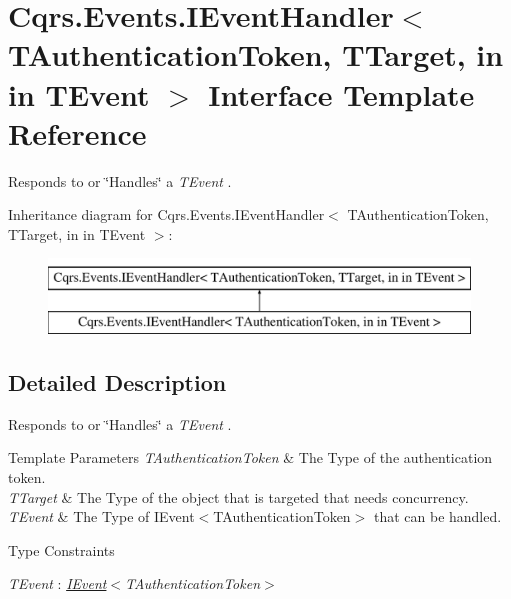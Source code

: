 \hypertarget{interfaceCqrs_1_1Events_1_1IEventHandler}{}\section{Cqrs.\+Events.\+I\+Event\+Handler$<$ T\+Authentication\+Token, T\+Target, in in T\+Event $>$ Interface Template Reference}
\label{interfaceCqrs_1_1Events_1_1IEventHandler}


Responds to or \char`\"{}\+Handles\char`\"{} a {\itshape T\+Event} .  


Inheritance diagram for Cqrs.\+Events.\+I\+Event\+Handler$<$ T\+Authentication\+Token, T\+Target, in in T\+Event $>$\+:\begin{figure}[H]
\begin{center}
\leavevmode
\includegraphics[height=2.000000cm]{interfaceCqrs_1_1Events_1_1IEventHandler}
\end{center}
\end{figure}


\subsection{Detailed Description}
Responds to or \char`\"{}\+Handles\char`\"{} a {\itshape T\+Event} . 


\begin{DoxyTemplParams}{Template Parameters}
{\em T\+Authentication\+Token} & The Type of the authentication token.\\
\hline
{\em T\+Target} & The Type of the object that is targeted that needs concurrency.\\
\hline
{\em T\+Event} & The Type of I\+Event$<$\+T\+Authentication\+Token$>$ that can be handled.\\
\hline
\end{DoxyTemplParams}
\begin{Desc}
\item[Type Constraints]\begin{description}
\item[{\em T\+Event} : {\em \hyperlink{interfaceCqrs_1_1Events_1_1IEvent}{I\+Event}$<$T\+Authentication\+Token$>$}]\end{description}
\end{Desc}
